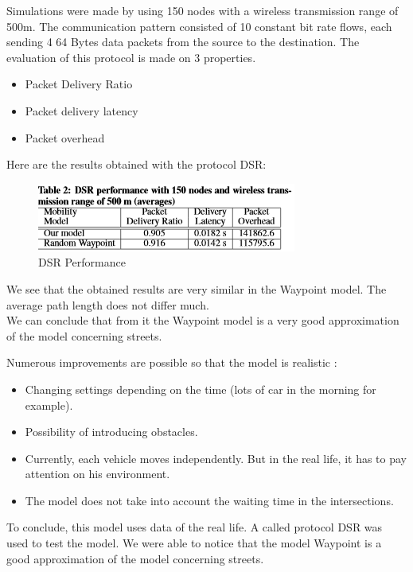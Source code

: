 Simulations were made by using 150 nodes with a wireless transmission range of 500m. The communication  pattern  consisted of 10 constant bit rate flows, each sending 4 64 Bytes data packets from the source to the destination.
The evaluation of this protocol is made on 3 properties.
\begin{itemize}
\item Packet Delivery Ratio
\item Packet delivery latency
\item Packet overhead
\end{itemize}

Here are the results obtained with the protocol DSR:\\

\begin{figure}[h]
\center
\includegraphics{../images/protocoleDSR.png}
\caption{\label{ProtDSR}DSR Performance}
\end{figure}

We see that the obtained results are very similar in the Waypoint model. The average path length does not differ much.\\
We can conclude that from it the Waypoint model is a very good approximation of the model concerning streets.

Numerous improvements are possible so that the model is realistic :

\begin{itemize}
\item Changing settings depending on the time (lots of car in the morning for example).
\item Possibility of introducing obstacles.
\item Currently, each vehicle moves independently. But in the real life, it has to pay attention on his environment.
\item The model does not take into account the waiting time in the intersections.
\end{itemize}

To conclude, this model uses data of the real life. A called protocol DSR was used to test the model. We were able to notice that the model Waypoint is a good approximation of the model concerning streets.

